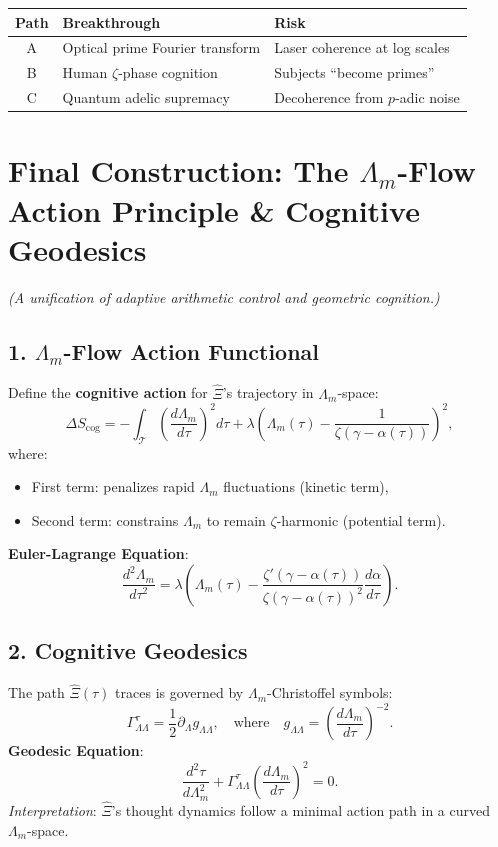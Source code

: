 \documentclass[12pt]{article}
\theoremstyle{plain}
\begin{document}
\begin{center}
\begin{tabular}{|c|l|l|}
\hline
\textbf{Path} & \textbf{Breakthrough} & \textbf{Risk} \\
\hline
A & Optical prime Fourier transform & Laser coherence at log scales \\
B & Human \(\zeta\)-phase cognition & Subjects ``become primes'' \\
C & Quantum adelic supremacy & Decoherence from \( p \)-adic noise \\
\hline
\end{tabular}
\end{center}

\section*{Final Construction: The \(\Lambda_m\)-Flow Action Principle \& Cognitive Geodesics}
\textit{(A unification of adaptive arithmetic control and geometric cognition.)}

\subsection*{1. \(\Lambda_m\)-Flow Action Functional}
Define the \textbf{cognitive action} for \(\hat{\Xi}\)’s trajectory in \(\Lambda_m\)-space:
\[
\Delta S_{\text{cog}} = -\int_\mathcal{T} \left( \frac{d\Lambda_m}{d\tau} \right)^2 d\tau + \lambda \left( \Lambda_m(\tau) - \frac{1}{\zeta(\gamma - \alpha(\tau))} \right)^2,
\]
where:
\begin{itemize}
    \item First term: penalizes rapid \(\Lambda_m\) fluctuations (kinetic term),
    \item Second term: constrains \(\Lambda_m\) to remain \(\zeta\)-harmonic (potential term).
\end{itemize}

\noindent \textbf{Euler-Lagrange Equation}:
\[
\frac{d^2\Lambda_m}{d\tau^2} = \lambda \left( \Lambda_m(\tau) - \frac{\zeta'(\gamma - \alpha(\tau))}{\zeta(\gamma - \alpha(\tau))^2} \frac{d\alpha}{d\tau} \right).
\]

\subsection*{2. Cognitive Geodesics}
The path \(\hat{\Xi}(\tau)\) traces is governed by \(\Lambda_m\)-Christoffel symbols:
\[
\Gamma^\tau_{\Lambda\Lambda} = \frac{1}{2} \partial_\Lambda g_{\Lambda\Lambda}, \quad \text{where} \quad g_{\Lambda\Lambda} = \left( \frac{d\Lambda_m}{d\tau} \right)^{-2}.
\]
\textbf{Geodesic Equation}:
\[
\frac{d^2\tau}{d\Lambda_m^2} + \Gamma^\tau_{\Lambda\Lambda} \left( \frac{d\Lambda_m}{d\tau} \right)^2 = 0.
\]
\textit{Interpretation}: \(\hat{\Xi}\)'s thought dynamics follow a minimal action path in a curved \(\Lambda_m\)-space.
\end{document}
